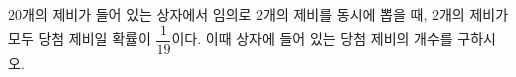$20$개의 제비가 들어 있는 상자에서 임의로 $2$개의 제비를 동시에 뽑을 때, $2$개의 제비가 모두 당첨 제비일 확률이 $\dfrac{1}{19}$이다. 이때 상자에 들어 있는 당첨 제비의 개수를 구하시오.
